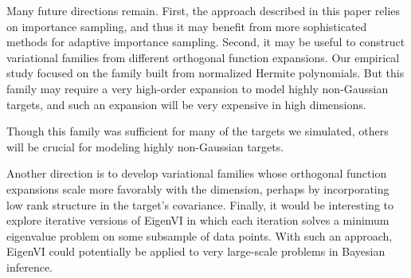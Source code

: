 Many future directions remain.
First, the approach described in this paper relies on importance sampling, and thus it may benefit from
more sophisticated methods for adaptive importance sampling. %
Second, it may be useful to construct  variational families from different orthogonal function expansions. Our empirical study focused on the family built from
normalized Hermite polynomials. But this family may require a very high-order expansion to model highly non-Gaussian targets, and such an expansion will be very expensive in high dimensions.
\iffalse
Without utilizing higher-order function expansions,
which are expensive in higher dimensions,
this family is limited to target functions that are close to Gaussian.
\fi
Though this family was sufficient for many of the targets we simulated, others will be crucial for modeling highly non-Gaussian targets.
\iffalse
As we observed in our simulation studies, this was sufficient for many of the targets
we considered.
In future work, designing new orthogonal basis sets will be crucial for
extension to highly non-Gaussian targets.
\fi
%
Another direction is to develop variational families whose orthogonal function
expansions scale more favorably with the dimension, perhaps by incorporating low rank structure in the target's covariance.
%
Finally, it would be interesting to explore iterative versions of EigenVI in which each iteration solves a minimum eigenvalue problem on some subsample of data points. With such an approach, EigenVI could potentially be applied to very large-scale problems in Bayesian inference.


